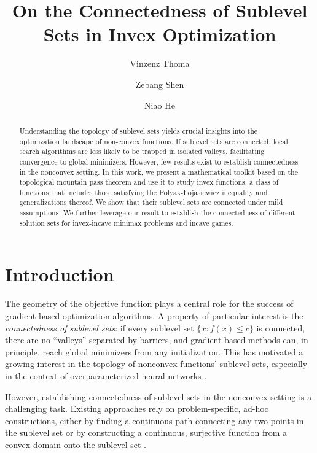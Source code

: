 \documentclass{article}
\title{On the Connectedness of Sublevel Sets in Invex Optimization}
\author[1,2]{Vinzenz Thoma}
\author[1]{Zebang Shen}
\author[1]{Niao He}
\affil[1]{{Department of Computer Science, ETH Zurich}}
\affil[2]{ETH AI Center}
\affil [ ]{\small{\ttfamily\{vinzenz.thoma, zebang.shen, niao.he\}@inf.ethz.ch}}
\date{}
\begin{document}
\maketitle

\begin{abstract}
    Understanding the topology of sublevel sets yields crucial insights into the optimization landscape of non-convex functions. If sublevel sets are connected, local search algorithms are less likely to be trapped in isolated valleys, facilitating convergence to global minimizers.
    However, few results exist to establish connectedness in the nonconvex setting. In this work, we present a mathematical toolkit based on the topological mountain pass theorem and use it to study invex functions, a class of functions that includes those satisfying the Polyak-\L{}ojasiewicz inequality and generalizations thereof. We show that their sublevel sets are connected under mild assumptions. We further leverage our result to establish the connectedness of different solution sets for invex-incave minimax problems and incave games.
\end{abstract}

\pagebreak


\pagebreak


\section{Introduction}
\label{sec:intro}

The geometry of the objective function plays a central role for the success of gradient-based optimization algorithms. A property of particular interest is the \emph{connectedness of sublevel sets}: if every sublevel set $\{x : f(x) \leq c\}$ is connected, there are no ``valleys'' separated by barriers, and gradient-based methods can, in principle, reach global minimizers from any initialization.
This has motivated a growing interest in the topology of nonconvex functions' sublevel sets, especially in the context of overparameterized neural networks \citep{Nguyen2019Connected,Nesterov2022Learning,Zeng2023Connected,Garipov2018Loss,Cooper2021Global,Draxler2018Essentially,Liu2022Loss}.

However, establishing connectedness of sublevel sets in the nonconvex setting is a challenging task. Existing approaches rely on problem-specific, ad-hoc constructions, either by finding a continuous path connecting any two points in the sublevel set \citep{Zeng2023Connected} or by constructing a continuous, surjective function from a convex domain onto the sublevel set \citep{Fatkhullin2021Optimizing}. 
\end{document}
